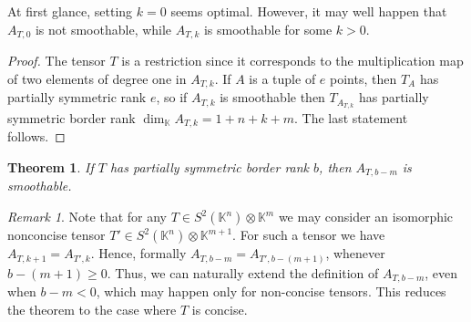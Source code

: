 \documentclass[a4paper,11pt,reqno]{amsart}
\newcommand{\bbK}{\mathbb{K}}
\numberwithin{equation}{section}
\theoremstyle{definition}
\theoremstyle{plain}
\newtheorem{teo}[defn]{Theorem}
\theoremstyle{remark}
\newtheorem{rem}[defn]{Remark}
\begin{document}
At first glance, {setting} $k=0$ seems optimal. However, it may well
    happen that $A_{T, 0}$ is not smoothable, while $A_{T, k}$ is smoothable
for some $k > 0$.
\begin{proof}
The tensor $T$ is a {restriction since} it corresponds to the multiplication map of
two elements of degree one in $A_{T, k}$.
If $A$ is a tuple of $e$ points, then $T_{A}$ has partially symmetric
rank $e$, so if
$A_{T,k}$ is smoothable then
$T_{A_{T,k}}$ has partially symmetric border rank $\dim_{\bbK} A_{T,k} = 1+n+k+m$.
The last
statement follows.
\end{proof}
\begin{teo}\label{thm:twoestimate}
If $T$ has partially symmetric border rank $b$, then $A_{T,b-m}$ is
smoothable.
\end{teo}
\begin{rem}
Note that for any $T \in S^2(\bbK^n)\otimes \bbK^m$ we may consider an
isomorphic nonconcise tensor $T'\in S^2(\bbK^n)\otimes \bbK^{m+1}$. For such a
tensor we have $A_{T,k+1}=A_{T',k}$. Hence, formally
$A_{T,b-m}=A_{T',b-(m+1)}$, whenever $b-(m+1)\geq 0$. {Thus, we can} naturally
extend the definition of $A_{T,b-m}$, even when $b-m<0$, which may happen only
for {non-concise} tensors. This reduces the theorem to the case {where} $T$ is
concise.
\end{rem}
\end{document}
